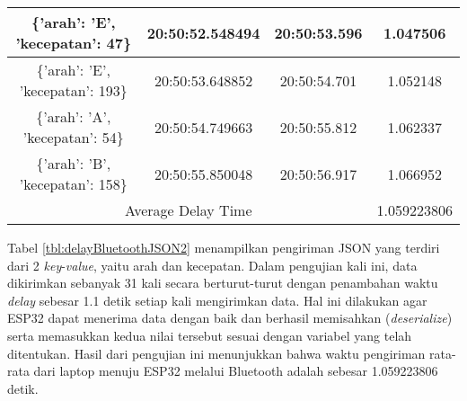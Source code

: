 \begin{longtable}{|ccc|c|}
    \multicolumn{1}{|c|}{\{'arah': 'E', 'kecepatan': 47\}}  & \multicolumn{1}{c|}{20:50:52.548494} & 20:50:53.596       & 1.047506    \\ \hline
    \multicolumn{1}{|c|}{\{'arah': 'E', 'kecepatan': 193\}} & \multicolumn{1}{c|}{20:50:53.648852} & 20:50:54.701       & 1.052148    \\ \hline
    \multicolumn{1}{|c|}{\{'arah': 'A', 'kecepatan': 54\}}  & \multicolumn{1}{c|}{20:50:54.749663} & 20:50:55.812       & 1.062337    \\ \hline
    \multicolumn{1}{|c|}{\{'arah': 'B', 'kecepatan': 158\}} & \multicolumn{1}{c|}{20:50:55.850048} & 20:50:56.917       & 1.066952    \\ \hline
    \multicolumn{3}{|c|}{Average Delay Time}                                                                            & 1.059223806 \\ \hline
\end{longtable}

Tabel \ref{tbl:delayBluetoothJSON2} menampilkan pengiriman JSON yang terdiri dari 2 \emph{key}-\emph{value}, yaitu arah dan kecepatan. Dalam pengujian kali ini, data dikirimkan sebanyak 31 kali secara berturut-turut dengan penambahan waktu \emph{delay} sebesar 1.1 detik setiap kali mengirimkan data. Hal ini dilakukan agar ESP32 dapat menerima data dengan baik dan berhasil memisahkan (\emph{deserialize}) serta memasukkan kedua nilai tersebut sesuai dengan variabel yang telah ditentukan. Hasil dari pengujian ini menunjukkan bahwa waktu pengiriman rata-rata dari laptop menuju ESP32 melalui Bluetooth adalah sebesar 1.059223806 detik.

